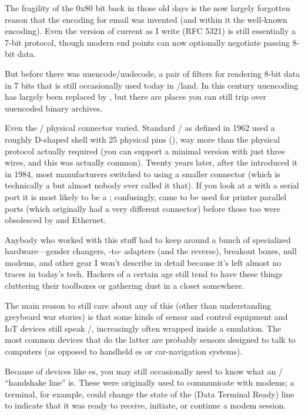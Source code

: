 The fragility of the 0x80 bit back in those old days is the now largely
forgotten reason that the  encoding for email was invented (and within it
the well-known  encoding). Even the version of  current as I write
(RFC 5321) is still essentially a 7-bit protocol, though modern end points can
now optionally negotiate passing 8-bit data.

But before  there was uuencode/uudecode, a pair of filters for rendering
8-bit data in 7 bits that is still occasionally used today in \UNIX/land. In this
century uuencoding has largely been replaced by , but there are places
you can still trip over uuencoded binary archives.

Even the \RSTTT/ physical connector varied. Standard \RSTTT/ as defined in 1962
used a roughly D-shaped shell with 25 physical pins (), way more than the
physical protocol actually required (you can support a minimal version with
just three wires, and this was actually common). Twenty years later, after the
 introduced it in 1984, most manufacturers switched to using a smaller
 connector (which is technically a  but almost nobody ever called it
that). If you look at a  with a serial port it is most likely to be a ;
confusingly,  came to be used for printer parallel ports (which originally
had a very different connector) before those too were obsolesced by  and
Ethernet.

Anybody who worked with this stuff had to keep around a bunch of specialized
hardware---gender changers, -to- adapters (and the reverse), breakout
boxes, null modems, and other gear I won't describe in detail because it's left
almost no traces in today's tech. Hackers of a certain age still tend to have
these things cluttering their toolboxes or gathering dust in a closet
somewhere.

The main reason to still care about any of this (other than understanding
greybeard war stories) is that some kinds of sensor and control equipment and
IoT devices still speak \RSTTT/, increasingly often wrapped inside a 
emulation. The most common devices that do the latter are probably  sensors
designed to talk to computers (as opposed to handheld es or car-navigation
systems).

Because of devices like es, you may still occasionally need to know what an
\RSTTT/ ``handshake line'' is. These were originally used to communicate with
modems; a terminal, for example, could change the state of the  (Data
Terminal Ready) line to indicate that it was ready to receive, initiate, or
continue a modem session.

